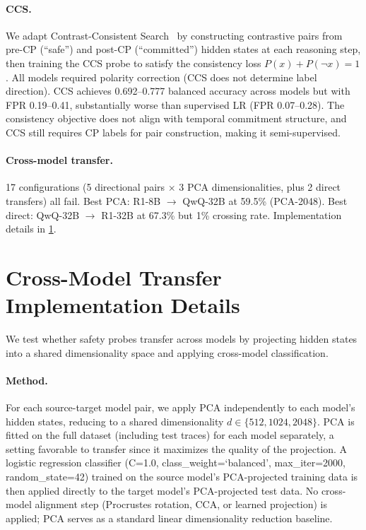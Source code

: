 \paragraph{CCS.} We adapt Contrast-Consistent Search~\cite{burns2023discovering} by constructing contrastive pairs from pre-CP (``safe'') and post-CP (``committed'') hidden states at each reasoning step, then training the CCS probe to satisfy the consistency loss $P(x) + P(\neg x) = 1$. All models required polarity correction (CCS does not determine label direction). CCS achieves 0.692--0.777 balanced accuracy across models but with FPR 0.19--0.41, substantially worse than supervised LR (FPR 0.07--0.28). The consistency objective does not align with temporal commitment structure, and CCS still requires CP labels for pair construction, making it semi-supervised.

\paragraph{Cross-model transfer.} 17 configurations (5 directional pairs $\times$ 3 PCA dimensionalities, plus 2 direct transfers) all fail. Best PCA: R1-8B $\rightarrow$ QwQ-32B at 59.5\% (PCA-2048). Best direct: QwQ-32B $\rightarrow$ R1-32B at 67.3\% but 1\% crossing rate. Implementation details in \cref{app:transfer_details}.

\section{Cross-Model Transfer Implementation Details}
\label{app:transfer_details}

We test whether safety probes transfer across models by projecting hidden states into a shared dimensionality space and applying cross-model classification.

\paragraph{Method.} For each source-target model pair, we apply PCA independently to each model's hidden states, reducing to a shared dimensionality $d \in \{512, 1024, 2048\}$. PCA is fitted on the full dataset (including test traces) for each model separately, a setting favorable to transfer since it maximizes the quality of the projection. A logistic regression classifier (C=1.0, class\_weight=`balanced', max\_iter=2000, random\_state=42) trained on the source model's PCA-projected training data is then applied directly to the target model's PCA-projected test data. No cross-model alignment step (Procrustes rotation, CCA, or learned projection) is applied; PCA serves as a standard linear dimensionality reduction baseline.

